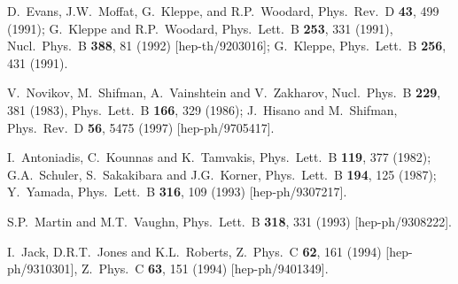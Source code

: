 \documentclass[12pt]{article}
\begin{document}
\begin{thebibliography}{999}
D.~Evans, J.W.~Moffat, G.~Kleppe, and R.P.~Woodard,
  Phys.\ Rev.\ D {\bf 43}, 499 (1991);
G.~Kleppe and R.P.~Woodard, 
  Phys.\ Lett.\ B {\bf 253}, 331 (1991),
  Nucl.\ Phys.\ B {\bf 388}, 81 (1992)
  [hep-th/9203016];
G.~Kleppe, 
  Phys.\ Lett.\ B {\bf 256}, 431 (1991).

V.~Novikov, M.~Shifman, A.~Vainshtein and V.~Zakharov, 
  Nucl.\ Phys.\ B {\bf 229}, 381 (1983),
  Phys.\ Lett.\ B {\bf 166}, 329 (1986);
J.~Hisano and M.~Shifman, 
  Phys.\ Rev.\ D {\bf 56}, 5475 (1997)
  [hep-ph/9705417].

I.~Antoniadis, C.~Kounnas and K.~Tamvakis,
  Phys.\ Lett.\ B {\bf 119}, 377 (1982);
G.A.~Schuler, S.~Sakakibara and J.G.~Korner,
  Phys.\ Lett.\ B {\bf 194}, 125 (1987);
Y.~Yamada,
  Phys.\ Lett.\ B {\bf 316}, 109 (1993)
  [hep-ph/9307217].

 S.P.~Martin and M.T.~Vaughn,
  Phys.\ Lett.\ B {\bf 318}, 331 (1993)
  [hep-ph/9308222].

 I.~Jack, D.R.T.~Jones and K.L.~Roberts,
  Z.\ Phys.\ C {\bf 62}, 161 (1994)
  [hep-ph/9310301],
  Z.\ Phys.\ C {\bf 63}, 151 (1994)
  [hep-ph/9401349].


\end{thebibliography}
\end{document}
